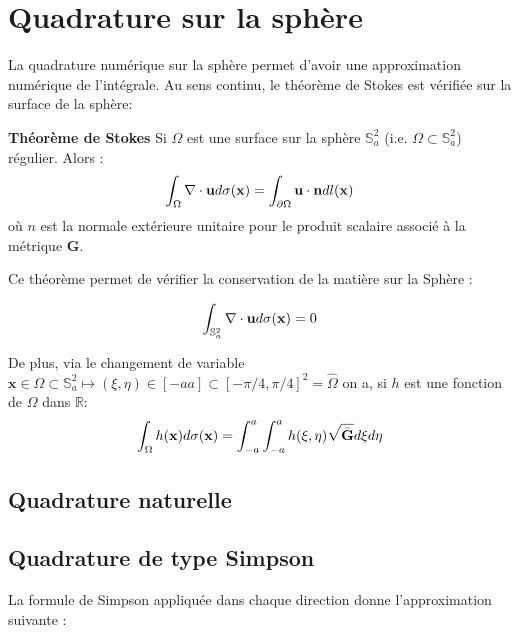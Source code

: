\section{Quadrature sur la sphère}

La quadrature numérique sur la sphère permet d'avoir une approximation numérique de l'intégrale. 
Au sens continu, le théorème de Stokes est vérifiée sur la surface de la sphère:

\begin{theoreme}
\textbf{Théorème de Stokes}
Si $\Omega$ est une surface sur la sphère $\mathbb{S}_a^2$ (i.e. $\Omega \subset \mathbb{S}_a^2$) régulier. Alors :
\begin{equation}
\displaystyle\int_\Omega \nabla \cdot \mathbf{u} d \sigma (\mathbf{x}) = \displaystyle\int_{\partial \Omega} \mathbf{u} \cdot \mathbf{n} dl(\mathbf{x})
\end{equation}
où $n$ est la normale extérieure unitaire pour le produit scalaire associé à la métrique $\mathbf{G}$.
\label{th: Stokes}
\end{theoreme}

Ce théorème permet de vérifier la conservation de la matière sur la Sphère :

\begin{equation}
\displaystyle\int_{\mathbb{S}_a^2}\nabla \cdot \mathbf{u} d \sigma (\mathbf{x}) = 0
\label{eq: Stokes global}
\end{equation}

De plus, via le changement de variable $\mathbf{x} \in \Omega \subset \mathbb{S}_a^2 \mapsto (\xi, \eta) \in [-a a] \subset [- \pi/4, \pi/4]^2 = \hat{\Omega}$ on a, si $h$ est une fonction de $\Omega$ dans $\mathbb{R}$:
\begin{equation}
\displaystyle\int_{\Omega} h(\mathbf{x}) d \sigma ( \mathbf{x} ) = \displaystyle\int_{-a}^a \displaystyle\int_{-a}^a h(\xi, \eta) \sqrt{\bar{\mathbf{G}}}d\xi d\eta
\end{equation}

\subsection{Quadrature naturelle}



\subsection{Quadrature de type Simpson}

La formule de Simpson appliquée dans chaque direction donne l'approximation suivante :

